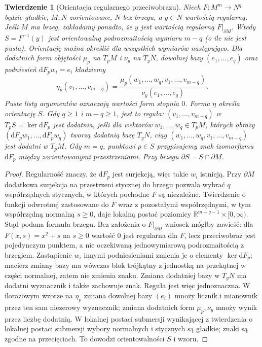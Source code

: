 \documentclass[11pt,a4paper,oneside]{report}
\newcommand{\R}{\mathbb{R}}
\newcommand{\dd}{\mathrm d}
\theoremstyle{plain}
\newtheorem{twierdzenie}{Twierdzenie}[section]
\theoremstyle{definition}
\theoremstyle{remark}
\begin{document}
\begin{twierdzenie}[Orientacja regularnego przeciwobrazu]
\label{thm:orientacja-poziomicy}
Niech $F:M^m\to N^q$ będzie gładkie,
$M,N$ zorientowane, $N$ bez brzegu, a $y\in N$ wartością
regularną. Jeśli $M$ ma brzeg, zakładamy ponadto, że $y$
jest wartością regularną $F|_{\partial M}$.
Wtedy $S=F^{-1}(y)$ jest orientowalną podrozmaitością
wymiaru $m-q$ (o ile nie jest pusta). Orientację
można określić dla wszystkich wymiarów następująco.
Dla dodatnich form objętości $\mu_p$ na $T_pM$
i $\nu_y$ na $T_yN$, dowolnej bazy $(e_1,\ldots,e_q)$
oraz podniesień $\dd F_pw_i=e_i$ kładziemy
\[
 \eta_p(v_1,\ldots,v_{m-q})
 =\frac{\mu_p(w_1,\ldots,w_q,v_1,\ldots,v_{m-q})}
        {\nu_y(e_1,\ldots,e_q)}.
\]
Puste listy argumentów oznaczają wartości form stopnia $0$.
Forma $\eta$ określa orientację $S$. Gdy $q\geq1$
i $m-q\geq1$, jest to reguła: $(v_1,\ldots,v_{m-q})$
w $T_pS=\ker\dd F_p$ jest dodatnia, jeśli dla
wektorów $w_1,\ldots,w_q\in T_pM$, których obrazy
$(\dd F_pw_1,\ldots,\dd F_pw_q)$ tworzą dodatnią
bazę $T_yN$, ciąg
$(w_1,\ldots,w_q,v_1,\ldots,v_{m-q})$
jest dodatni w $T_pM$. Gdy $m=q$, punktowi $p\in S$
przypisujemy znak izomorfizmu $\dd F_p$ między
zorientowanymi przestrzeniami. Przy brzegu
$\partial S=S\cap\partial M$.
\end{twierdzenie}
\begin{proof}
Regularność znaczy, że $\dd F_p$ jest surjekcją,
więc takie $w_i$ istnieją. Przy $\partial M$ dodatkowa
surjekcja na przestrzeni stycznej do brzegu pozwala wybrać
$q$ współrzędnych stycznych, w których pochodne $F$ są
niezależne. Twierdzenie o funkcji odwrotnej zastosowane
do $F$ wraz z pozostałymi współrzędnymi, w tym współrzędną
normalną $s\geq0$, daje lokalną postać poziomicy
$\R^{m-q-1}\times[0,\infty)$. Stąd podana formuła brzegu.
Bez założenia o $F|_{\partial M}$ wniosek mógłby zawieść:
dla $F(x,s)=x^2+s$ na $s\geq0$ wartość $0$ jest regularna
dla $F$, lecz przeciwobraz jest pojedynczym punktem,
a nie oczekiwaną jednowymiarową podrozmaitością z brzegiem. Zastąpienie $w_i$
innymi podniesieniami zmienia je o elementy
$\ker\dd F_p$; macierz zmiany bazy ma wówczas
blok trójkątny z jednostką na przekątnej w części
normalnej, zatem nie zmienia znaku. Zmiana
dodatniej bazy w $T_yN$ ma dodatni wyznacznik
i także zachowuje znak. Reguła jest więc
jednoznaczna. W ilorazowym wzorze na $\eta_p$ zmiana
dowolnej bazy $(e_i)$ mnoży licznik i mianownik przez
ten sam niezerowy wyznacznik; zmiana dodatnich form
$\mu_p,\nu_y$ mnoży wynik przez liczbę dodatnią.
W lokalnej postaci submersji wynikającej z twierdzenia o lokalnej postaci submersji wybory normalnych
i stycznych są gładkie; znaki są zgodne na przecięciach.
To dowodzi orientowalności $S$ i wzoru.
\end{proof}
\end{document}
